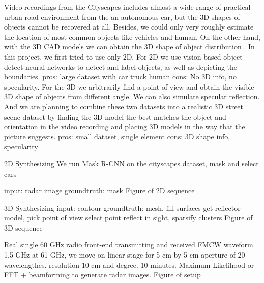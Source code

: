 Video recordings from the Cityscapes includes almost a wide range of practical urban road environment from the an autonomous car, but the 3D shapes of objects cannot be recovered at all. Besides, we could only very roughly estimate the location of most common objects like vehicles and human. On the other hand, with the 3D CAD models we can obtain the 3D shape of object distribution . In this project, we first tried to use only 2D. For 2D we use vision-based object detect neural networks to detect and label objects, as well as depicting the boundaries. pros: large dataset with car truck human cons: No 3D info, no specularity. 
For the 3D we arbitrarily find a point of view and obtain the visible 3D shape of objects from different angle. We can also simulate specular reflection. And we are planning to combine these two datasets into a realistic 3D street scene dataset by finding the 3D model the best matches the object and orientation in the video recording and placing 3D models in the way that the picture suggests. pros: small dataset, single element 
cons: 3D shape info, specularity  


2D Synthesizing 
	We run Mask R-CNN on the cityscapes dataset, mask and select cars 
	
	input: radar image
	groundtruth: mask
Figure of 2D sequence
	
3D Synthesizing 
	input: contour
	groundtruth:
	mesh, fill surfaces get reflector model, pick point of view select point reflect in sight, sparsify clusters
Figure of 3D sequence

Real 
single 60 GHz radio front-end transmitting and received FMCW waveform 1.5 GHz at 61 GHz, we move on linear stage for 5 cm by 5 cm aperture of 20 wavelengthes. resolution 10 cm and degree. 10 minutes. Maximum Likelihood or FFT + beamforming to generate radar images. Figure of setup  
		
	

